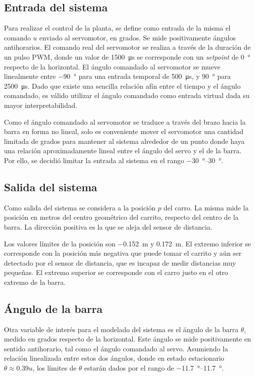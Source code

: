 \subsection{Entrada del sistema}

Para realizar el control de la planta, se define como entrada de la misma el comando $u$ enviado al servomotor, en grados. Se mide positivamente ángulos antihorarios. El comando real del servomotor se realiza a través de la duración de un pulso PWM, donde un valor de \qty{1500}{\us} se corresponde con un \emph{setpoint} de \qty{0}{\degree} respecto de la horizontal. El ángulo comandado al servomotor se mueve linealmente entre \qty{-90}{\degree} para una entrada temporal de \qty{500}{\us}, y \qty{90}{\degree} para \qty{2500}{\us}. Dado que existe una sencilla relación afín entre el tiempo y el ángulo comandado, es válido utilizar el ángulo comandado como entrada virtual dada su mayor interpretabilidad.

Como el ángulo comandado al servomotor se traduce a través del brazo hacia la barra en forma no lineal, solo es conveniente mover el servomotor una cantidad limitada de grados para mantener al sistema alrededor de un punto donde haya una relación aproximadamente lineal entre el ángulo del servo y el de la barra. Por ello, se decidió limitar la entrada al sistema en el rango \qtyrange{-30}{30}{\degree}.

\subsection{Salida del sistema}

Como salida del sistema se considera a la posición $p$ del carro. La misma mide la posición en metros del centro geométrico del carrito, respecto del centro de la barra. La dirección positiva es la que se aleja del sensor de distancia.

Los valores límites de la posición son \qty{-0.152}{\m} y \qty{0.172}{\m}. El extremo inferior se corresponde con la posición más negativa que puede tomar el carrito y aún ser detectado por el sensor de distancia, que es incapaz de medir distancias muy pequeñas. El extremo superior se corresponde con el carro justo en el otro extremo de la barra.

\subsection{Ángulo de la barra}

Otra variable de interés para el modelado del sistema es el ángulo de la barra $\theta$, medido en grados respecto de la horizontal. Este ángulo se mide positivamente en sentido antihorario, tal como el ángulo comandado al servo. Asumiendo la relación linealizada entre estos dos ángulos, donde en estado estacionario $\theta \approx 0.39 u$, los límites de $\theta$ estarán dados por el rango de \qtyrange{-11.7}{11.7}{\degree}.

